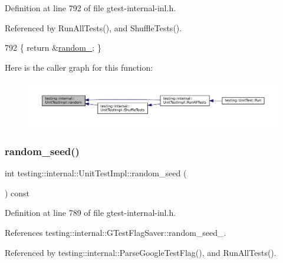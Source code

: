 Definition at line 792 of file gtest-\/internal-\/inl.\+h.



Referenced by Run\+All\+Tests(), and Shuffle\+Tests().


\begin{DoxyCode}
792 \{ \textcolor{keywordflow}{return} &\hyperlink{classtesting_1_1internal_1_1UnitTestImpl_a08551d7ff0ebb976ec82294ded8113ea}{random\_}; \}
\end{DoxyCode}
Here is the caller graph for this function\+:
\nopagebreak
\begin{figure}[H]
\begin{center}
\leavevmode
\includegraphics[width=350pt]{classtesting_1_1internal_1_1UnitTestImpl_ab3b45b5eb4d583219a3602011ea44347_icgraph}
\end{center}
\end{figure}
\mbox{\label{classtesting_1_1internal_1_1UnitTestImpl_a625b9fb6d17b008c44fc902255e6343c}} 
\subsubsection{\texorpdfstring{random\+\_\+seed()}{random\_seed()}}
{\footnotesize\ttfamily int testing\+::internal\+::\+Unit\+Test\+Impl\+::random\+\_\+seed (\begin{DoxyParamCaption}{ }\end{DoxyParamCaption}) const\hspace{0.3cm}{\ttfamily [inline]}}



Definition at line 789 of file gtest-\/internal-\/inl.\+h.



References testing\+::internal\+::\+G\+Test\+Flag\+Saver\+::random\+\_\+seed\+\_\+.



Referenced by testing\+::internal\+::\+Parse\+Google\+Test\+Flag(), and Run\+All\+Tests().


